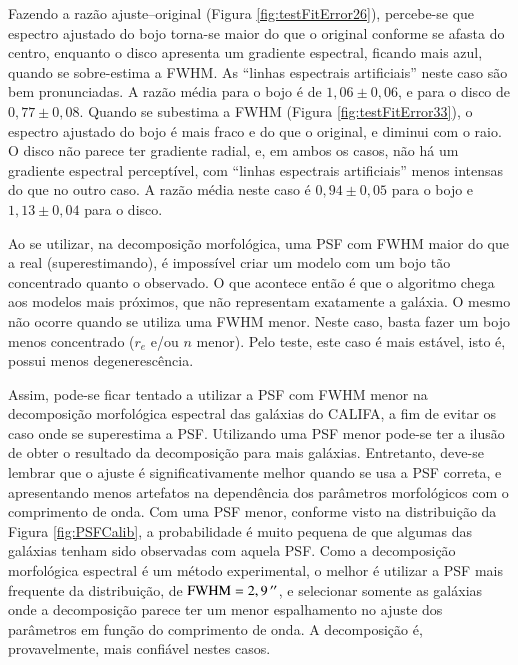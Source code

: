 Fazendo a razão ajuste--original (Figura \ref{fig:testFitError26}), percebe-se
que espectro ajustado do bojo torna-se maior do que o original conforme se
afasta do centro, enquanto o disco apresenta um gradiente espectral, ficando
mais azul, quando se sobre-estima a FWHM. As ``linhas espectrais artificiais''
neste caso são bem pronunciadas. A razão média para o bojo é de $1,06 \pm 0,06$,
e para o disco de $0,77 \pm 0,08$. Quando se subestima a FWHM (Figura
\ref{fig:testFitError33}), o espectro ajustado do bojo é mais fraco e do que o
original, e diminui com o raio. O disco não parece ter gradiente radial, e, em
ambos os casos, não há um gradiente espectral perceptível, com ``linhas
espectrais artificiais'' menos intensas do que no outro caso. A razão média
neste caso é $0,94 \pm 0,05$ para o bojo e $1,13 \pm 0,04$ para o disco.

Ao se utilizar, na decomposição morfológica, uma PSF com FWHM maior do que a
real (superestimando), é impossível criar um modelo com um bojo tão concentrado
quanto o observado. O que acontece então é que o algoritmo chega aos modelos
mais próximos, que não representam exatamente a galáxia. O mesmo não ocorre
quando se utiliza uma FWHM menor. Neste caso, basta fazer um bojo menos
concentrado ($r_e$ e/ou $n$ menor). Pelo teste, este caso é mais estável, isto
é, possui menos degenerescência.


Assim, pode-se ficar tentado a utilizar a PSF com FWHM menor na decomposição
morfológica espectral das galáxias do CALIFA, a fim de evitar os caso onde se
superestima a PSF. Utilizando uma PSF menor pode-se ter a ilusão de obter o
resultado da decomposição para mais galáxias. Entretanto, deve-se lembrar que o
ajuste é significativamente melhor quando se usa a PSF correta, e apresentando
menos artefatos na dependência dos parâmetros morfológicos com o comprimento de
onda. Com uma PSF menor, conforme visto na distribuição da Figura
\ref{fig:PSFCalib}, a probabilidade é muito pequena de que algumas das galáxias
tenham sido observadas com aquela PSF. Como a decomposição morfológica espectral
é um método experimental, o melhor é utilizar a PSF mais frequente da
distribuição, de $\mathrm{FWHM} = 2,9\,^{\prime\prime}$, e selecionar somente as galáxias
onde a decomposição parece ter um menor espalhamento no ajuste dos parâmetros em
função do comprimento de onda. A decomposição é, provavelmente, mais confiável
nestes casos.


